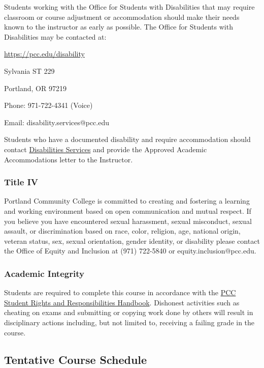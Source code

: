 \documentclass[11pt]{article}
\begin{document}
Students working with the Office for Students with Disabilities that may
require classroom or course adjustment or accommodation should make
their needs known to the instructor as early as possible. The Office for
Students with Disabilities may be contacted at:

\url{https://pcc.edu/disability}

Sylvania ST 229

Portland, OR 97219

Phone: 971-722-4341 (Voice)

Email: disability.services@pcc.edu

Students who have a documented disability and require accommodation
should contact
\href{http://www.pcc.edu/resources/disability}{Disabilities Services}
and provide the Approved Academic Accommodations letter to the
Instructor.

    \hypertarget{title-iv}{%
\subsubsection{Title IV}\label{title-iv}}

Portland Community College is committed to creating and fostering a
learning and working environment based on open communication and mutual
respect. If you believe you have encountered sexual harassment, sexual
misconduct, sexual assault, or discrimination based on race, color,
religion, age, national origin, veteran status, sex, sexual orientation,
gender identity, or disability please contact the Office of Equity and
Inclusion at (971) 722-5840 or equity.inclusion@pcc.edu.

    \hypertarget{academic-integrity}{%
\subsubsection{Academic Integrity}\label{academic-integrity}}

Students are required to complete this course in accordance with the
\href{https://www.pcc.edu/about/policy/student-rights/documents/student-conduct.pdf}{PCC
Student Rights and Responsibilities Handbook}. Dishonest activities such
as cheating on exams and submitting or copying work done by others will
result in disciplinary actions including, but not limited to, receiving
a failing grade in the course.

    \hypertarget{tentative-course-schedule}{%
\subsection{Tentative Course Schedule}\label{tentative-course-schedule}}
\end{document}
